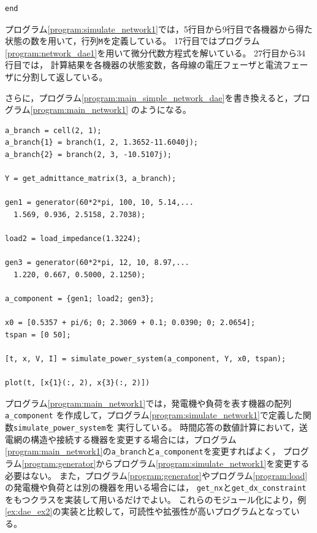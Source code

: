 \documentclass[tombow,dvipdfmx]{corona-a5-1.1}
\begin{document}
\begin{例}[発電機と負荷のモジュール化]
\begin{PROGRAMA}[count,title={simulate\_power\_system.m}]
\begin{verbatim}
end
\end{verbatim}
\end{PROGRAMA}

プログラム\nobreak\ref{program:simulate_network1}では，5行目から9行目で各機器から得た
状態の数を用いて，行列\verb|M|を定義している。
17行目ではプログラム\nobreak\ref{program:network_dae1}を用いて微分代数方程式を解いている。
27行目から34行目では，
計算結果を各機器の状態変数，各母線の電圧フェーザと電流フェーザに分割して返している。


さらに，プログラム\nobreak\ref{program:main_simple_network_dae}を書き換えると，プログラム\nobreak\ref{program:main_network1}
のようになる。

\smallskip
\begin{PROGRAMA}[count,title={main\_simulation\_3bus.m}]\label{program:main_network1}
\begin{verbatim}
a_branch = cell(2, 1);
a_branch{1} = branch(1, 2, 1.3652-11.6040j);
a_branch{2} = branch(2, 3, -10.5107j);

Y = get_admittance_matrix(3, a_branch);

gen1 = generator(60*2*pi, 100, 10, 5.14,...
  1.569, 0.936, 2.5158, 2.7038);

load2 = load_impedance(1.3224);

gen3 = generator(60*2*pi, 12, 10, 8.97,...
  1.220, 0.667, 0.5000, 2.1250);

a_component = {gen1; load2; gen3};

x0 = [0.5357 + pi/6; 0; 2.3069 + 0.1; 0.0390; 0; 2.0654];
tspan = [0 50];

[t, x, V, I] = simulate_power_system(a_component, Y, x0, tspan);

plot(t, [x{1}(:, 2), x{3}(:, 2)])
\end{verbatim}
\end{PROGRAMA}

プログラム\nobreak\ref{program:main_network1}では，発電機や負荷を表す機器の配列\verb|a_component|
を作成して，プログラム\nobreak\ref{program:simulate_network1}で定義した関数\verb|simulate_power_system|を
実行している。
時間応答の数値計算において，送電網の構造や接続する機器を変更する場合には，プログラム
\ref{program:main_network1}の\verb|a_branch|と\verb|a_component|を変更すればよく，
プログラム\nobreak\ref{program:generator}からプログラム\ref{program:simulate_network1}を変更する必要はない。
また，プログラム\nobreak\ref{program:generator}やプログラム\ref{program:load}の発電機や負荷とは別の機器を用いる場合には，
\verb|get_nx|と\verb|get_dx_constraint|をもつクラスを実装して用いるだけでよい。
これらのモジュール化により，例\ref{ex:dae_ex2}の実装と比較して，可読性や拡張性が高いプログラムとなっている。
\end{例}
\end{document}
